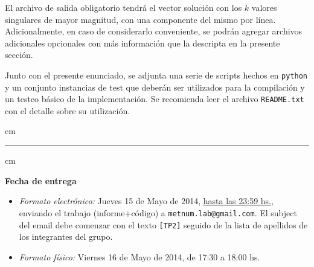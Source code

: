 El archivo de salida obligatorio tendr\'a el vector soluci\'on con los $k$ valores singulares de mayor magnitud, con una
componente del mismo por l\'inea. Adicionalmente, en caso de considerarlo conveniente, se podr\'an agregar archivos
adicionales opcionales con m\'as informaci\'on que la descripta en la presente secci\'on.

Junto con el presente enunciado, se adjunta una serie de scripts hechos en \verb+python+ y un conjunto instancias de
test que deber\'an ser utilizados para la compilaci\'on y un testeo b\'asico de la implementaci\'on. Se recomienda leer
el archivo \verb+README.txt+ con el detalle sobre su utilizaci\'on.


 cm
\hrule
{} cm

{\bf Fecha de entrega} 
\begin{itemize}
\item \textsl{Formato electr\'onico:} Jueves 15 de Mayo de 2014, \underline{hasta las 23:59 hs.}, enviando el trabajo
(informe+c\'odigo) a \texttt{metnum.lab@gmail.com}. El subject del email debe comenzar con el texto \verb|[TP2]| seguido
de la lista de apellidos de los integrantes del grupo. 
\item \textsl{Formato f\'isico:} Viernes 16 de Mayo de 2014, de 17:30 a 18:00 hs.
\end{itemize}


%
